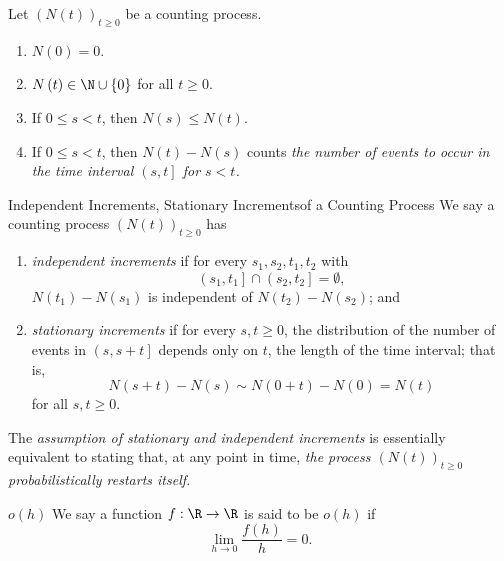 \documentclass[stat333]{subfiles}
\begin{document}
    Let $\left( N\left( t \right) \right)^{}_{t\geq 0}$ be a counting process.
    \begin{enumerate}
        \item $N\left( 0 \right)=0$.
        \item $N\left( t \right)\in\N\cup\left\lbrace 0 \right\rbrace$ for all $t\geq 0$.
        \item If $0\leq s<t$, then $N\left( s \right)\leq N\left( t \right)$.
        \item If $0\leq s<t$, then $N\left( t \right)-N\left( s \right)$ counts \textit{the number of events to occur in the time interval $\left( s,t \right]$ for $s<t$.}
    \end{enumerate}
    
    \begin{definition}{Independent Increments, Stationary Increments}{of a Counting Process}
        We say a counting process $\left( N\left( t \right) \right)^{}_{t\geq 0}$ has
        \begin{enumerate}
            \item \emph{independent increments} if for every $s_1,s_2,t_1,t_2$ with 
                \begin{equation*}
                    \left( s_1,t_1 \right]\cap\left( s_2,t_2 \right]=\emptyset,
                \end{equation*}
                $N\left( t_1 \right)-N\left( s_1 \right)$ is independent of $N\left( t_2 \right)-N\left( s_2 \right)$; and
            \item \emph{stationary increments} if for every $s,t\geq 0$, the distribution of the number of events in $\left( s,s+t \right]$ depends only on $t$, the length of the time interval; that is, 
                \begin{equation*}
                    N\left( s+t \right)-N\left( s \right)\sim N\left( 0+t \right)-N\left( 0 \right) = N\left( t \right)
                \end{equation*}
                for all $s,t\geq 0$.
        \end{enumerate}
    \end{definition}

    \np The \textit{assumption of stationary and independent increments} is essentially equivalent to stating that, at any point in time, \textit{the process $\left( N\left( t \right) \right)^{}_{t\geq 0}$ probabilistically restarts itself.} 

    \begin{recall}{$o\left( h \right)$}{}
        We say a function $f:\R\to\R$ is said to be $o\left( h \right)$ if
        \begin{equation*}
            \lim_{h\to 0} \frac{f\left( h \right)}{h} = 0.
        \end{equation*}
    \end{recall}
\end{document}
